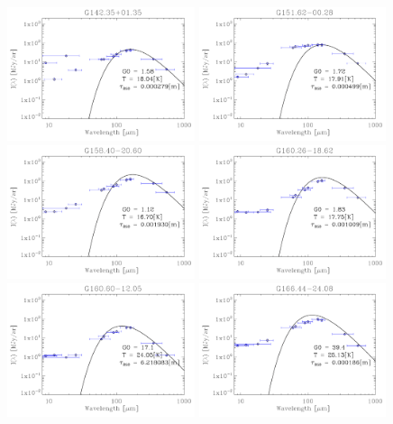\begin{figure}
\centering
\includegraphics[trim=-1mm -1mm -1mm -1mm, clip, width=55mm]{appB/appB_36.pdf}
\includegraphics[trim=-1mm -1mm -1mm -1mm, clip, width=55mm]{appB/appB_37.pdf}
\includegraphics[trim=-1mm -1mm -1mm -1mm, clip, width=55mm]{appB/appB_38.pdf}
\includegraphics[trim=-1mm -1mm -1mm -1mm, clip, width=55mm]{appB/appB_39.pdf}
\includegraphics[trim=-1mm -1mm -1mm -1mm, clip, width=55mm]{appB/appB_40.pdf}
\includegraphics[trim=-1mm -1mm -1mm -1mm, clip, width=55mm]{appB/appB_41.pdf}

\end{figure}
